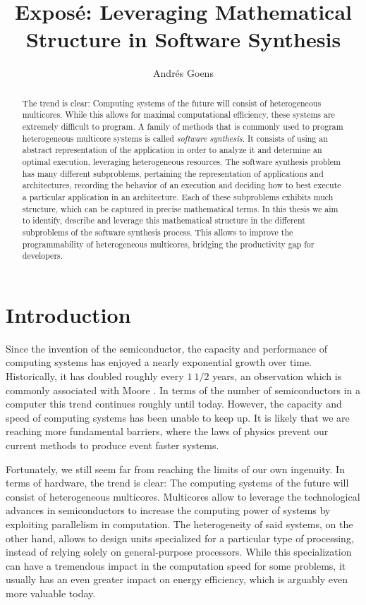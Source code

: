 \documentclass[sigplan,10pt]{acmart}
\title{Expos\'{e}: Leveraging Mathematical Structure in Software Synthesis}
\author{Andr\'{e}s Goens}
\begin{document}
\date{}
\begin{abstract}
The trend is clear: Computing systems of the future will consist of heterogeneous multicores.
While this allows for maximal computational efficiency, these systems are extremely difficult to program.
A family of methods that is commonly used to program heterogeneous multicore systems is called \emph{software synthesis}.
It consists of using an abstract representation of the application in order to analyze it and determine an optimal execution, leveraging heterogeneous resources.
The software synthesis problem has many different subproblems, pertaining the representation of applications and architectures, recording the behavior of an execution and deciding how to best execute a particular application in an architecture.
Each of these subproblems exhibits much structure, which can be captured in precise mathematical terms. In this thesis we aim to identify, describe and leverage this mathematical structure in the different subproblems of the software synthesis process.
This allows to improve the programmability of heterogeneous multicores, bridging the productivity gap for developers.

\end{abstract}

\maketitle

\section*{Introduction}
Since the invention of the semiconductor, the capacity and performance of computing systems has enjoyed a nearly exponential growth over time.
Historically, it has doubled roughly every $1~1/2$ years, an observation which is commonly associated with Moore \cite{schaller1997moore}.
In terms of the number of semiconductors in a computer this trend continues roughly until today. However, the capacity and speed of computing systems has been unable to keep up.
It is likely that we are reaching more fundamental barriers, where the laws of physics prevent our current methods to produce event faster systems. 

Fortunately, we still seem far from reaching the limits of our own ingenuity. In terms of hardware, the trend is clear: The computing systems of the future will consist of heterogeneous multicores. Multicores allow to leverage the technological advances in semiconductors to 
increase the computing power of systems by exploiting parallelism in computation. The heterogeneity of said systems, on the other hand, allows to design units specialized for a particular type of processing, instead of relying solely on general-purpose processors.
While this specialization can have a tremendous impact in the computation speed for some problems, it usually has an even greater impact on energy efficiency, which is arguably even more valuable today.
\end{document}

